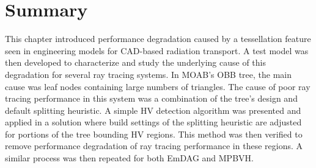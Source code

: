 
\section{Summary}

This chapter introduced performance degradation caused by a tessellation feature
seen in engineering models for CAD-based radiation transport. A test model was then
developed to characterize and study the underlying cause of this degradation for
several ray tracing systems. In MOAB's OBB tree, the main cause was leaf nodes
containing large numbers of triangles. The cause of poor ray tracing performance
in this system was a combination of the tree's design and default splitting
heuristic. A simple HV detection algorithm was presented and applied in a
solution where build settings of the splitting heuristic are adjusted for
portions of the tree bounding HV regions. This method was then verified to
remove performance degradation of ray tracing performance in these regions. A
similar process was then repeated for both EmDAG and MPBVH.

